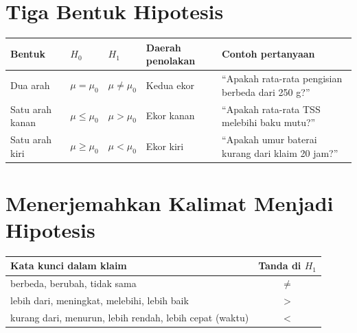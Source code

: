 \documentclass[
  indonesian,
  letterpaper,
]{book}
\newcounter{none} %
\begin{document}
\section{Tiga Bentuk Hipotesis}\label{tiga-bentuk-hipotesis}

{\def\LTcaptype{none} %
\begin{longtable}[]{@{}
  >{\raggedright\arraybackslash}p{}
  >{\centering\arraybackslash}p{}
  >{\centering\arraybackslash}p{}
  >{\raggedright\arraybackslash}p{}
  >{\raggedright\arraybackslash}p{}@{}}
\toprule\noalign{}
\begin{minipage}[b]{\linewidth}\raggedright
Bentuk
\end{minipage} & \begin{minipage}[b]{\linewidth}\centering
\(H_0\)
\end{minipage} & \begin{minipage}[b]{\linewidth}\centering
\(H_1\)
\end{minipage} & \begin{minipage}[b]{\linewidth}\raggedright
Daerah penolakan
\end{minipage} & \begin{minipage}[b]{\linewidth}\raggedright
Contoh pertanyaan
\end{minipage} \\
\midrule\noalign{}
\endhead
\bottomrule\noalign{}
\endlastfoot
Dua arah & \(\mu = \mu_0\) & \(\mu \neq \mu_0\) & Kedua ekor & ``Apakah
rata-rata pengisian berbeda dari 250 g?'' \\
Satu arah kanan & \(\mu \leq \mu_0\) & \(\mu > \mu_0\) & Ekor kanan &
``Apakah rata-rata TSS melebihi baku mutu?'' \\
Satu arah kiri & \(\mu \geq \mu_0\) & \(\mu < \mu_0\) & Ekor kiri &
``Apakah umur baterai kurang dari klaim 20 jam?'' \\
\end{longtable}
}

\section{Menerjemahkan Kalimat Menjadi
Hipotesis}\label{menerjemahkan-kalimat-menjadi-hipotesis}

{\def\LTcaptype{none} %
\begin{longtable}[]{@{}lc@{}}
\toprule\noalign{}
Kata kunci dalam klaim & Tanda di \(H_1\) \\
\midrule\noalign{}
\endhead
\bottomrule\noalign{}
\endlastfoot
berbeda, berubah, tidak sama & \(\neq\) \\
lebih dari, meningkat, melebihi, lebih baik & \(>\) \\
kurang dari, menurun, lebih rendah, lebih cepat (waktu) & \(<\) \\
\end{longtable}
}
\end{document}

